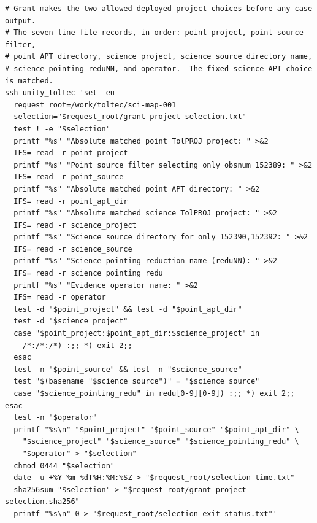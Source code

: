 \documentclass[11pt]{article}
\begin{document}
\begin{small}
\begin{verbatim}
# Grant makes the two allowed deployed-project choices before any case output.
# The seven-line file records, in order: point project, point source filter,
# point APT directory, science project, science source directory name,
# science pointing reduNN, and operator.  The fixed science APT choice is matched.
ssh unity_toltec 'set -eu
  request_root=/work/toltec/sci-map-001
  selection="$request_root/grant-project-selection.txt"
  test ! -e "$selection"
  printf "%s" "Absolute matched point TolPROJ project: " >&2
  IFS= read -r point_project
  printf "%s" "Point source filter selecting only obsnum 152389: " >&2
  IFS= read -r point_source
  printf "%s" "Absolute matched point APT directory: " >&2
  IFS= read -r point_apt_dir
  printf "%s" "Absolute matched science TolPROJ project: " >&2
  IFS= read -r science_project
  printf "%s" "Science source directory for only 152390,152392: " >&2
  IFS= read -r science_source
  printf "%s" "Science pointing reduction name (reduNN): " >&2
  IFS= read -r science_pointing_redu
  printf "%s" "Evidence operator name: " >&2
  IFS= read -r operator
  test -d "$point_project" && test -d "$point_apt_dir"
  test -d "$science_project"
  case "$point_project:$point_apt_dir:$science_project" in
    /*:/*:/*) :;; *) exit 2;;
  esac
  test -n "$point_source" && test -n "$science_source"
  test "$(basename "$science_source")" = "$science_source"
  case "$science_pointing_redu" in redu[0-9][0-9]) :;; *) exit 2;; esac
  test -n "$operator"
  printf "%s\n" "$point_project" "$point_source" "$point_apt_dir" \
    "$science_project" "$science_source" "$science_pointing_redu" \
    "$operator" > "$selection"
  chmod 0444 "$selection"
  date -u +%Y-%m-%dT%H:%M:%SZ > "$request_root/selection-time.txt"
  sha256sum "$selection" > "$request_root/grant-project-selection.sha256"
  printf "%s\n" 0 > "$request_root/selection-exit-status.txt"'


\end{verbatim}
\end{small}
\end{document}
